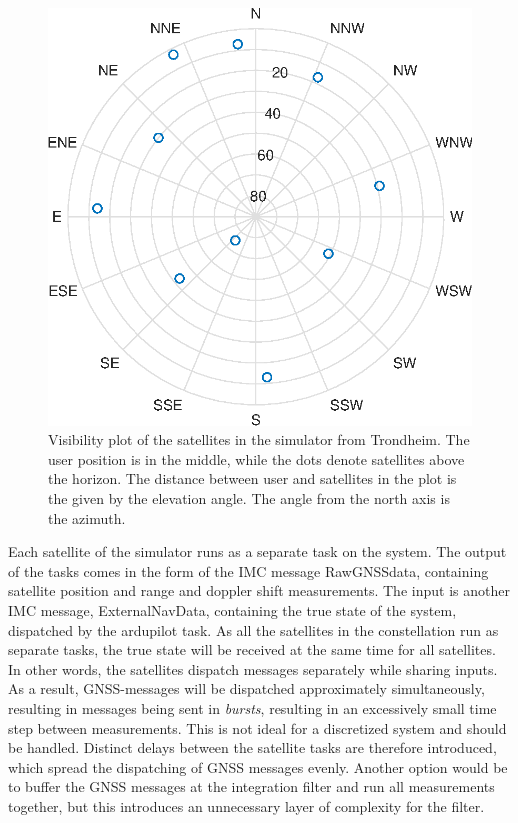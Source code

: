         \begin{figure}[!htbp]
            \centering
            \includegraphics[scale=0.7]{Implementation/Images/visibilityplot.eps}
            \caption{Visibility plot of the satellites in the simulator from Trondheim. The user position is in the middle, while the dots denote satellites above the horizon. The distance between user and satellites in the plot is the given by the elevation angle. The angle from the north axis is the azimuth.}
            \label{fig:visplot}
        \end{figure}

    Each satellite of the simulator runs as a separate task on the system. The output of the tasks comes in the form of the IMC message RawGNSSdata, containing satellite position and range and doppler shift measurements. The input is another IMC message, ExternalNavData, containing the true state of the system, dispatched by the ardupilot task. As all the satellites in the constellation run as separate tasks, the true state will be received at the same time for all satellites. In other words, the satellites dispatch messages separately while sharing inputs. As a result, GNSS-messages will be dispatched approximately simultaneously, resulting in messages being sent in \textit{bursts}, resulting in an excessively small time step between measurements. This is not ideal for a discretized system and should be handled. Distinct delays between the satellite tasks are therefore introduced, which spread the dispatching of GNSS messages evenly. Another option would be to buffer the GNSS messages at the integration filter and run all measurements together, but this introduces an unnecessary layer of complexity for the filter. \\
    
